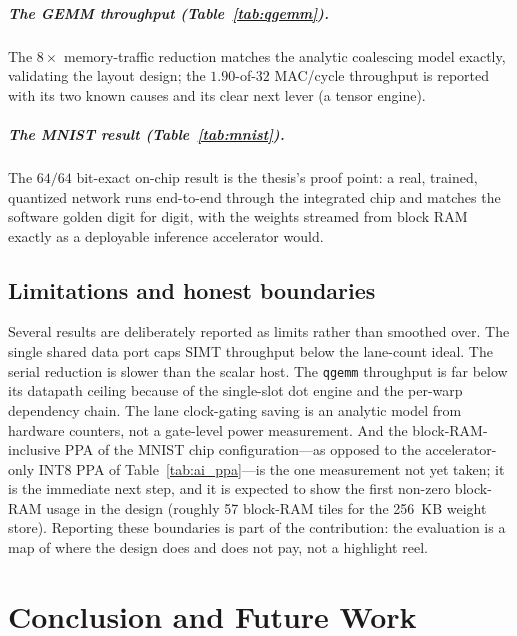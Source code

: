 \documentclass[12pt,a4paper,oneside]{report}
\newcommand{\code}[1]{\texttt{#1}}
\begin{document}
\paragraph{The GEMM throughput (Table~\ref{tab:qgemm}).} The $8\times$
memory-traffic reduction matches the analytic coalescing model exactly, validating
the layout design; the $1.90$-of-$32$ MAC/cycle throughput is reported with its two
known causes and its clear next lever (a tensor engine).

\paragraph{The MNIST result (Table~\ref{tab:mnist}).} The $64/64$ bit-exact
on-chip result is the thesis's proof point: a real, trained, quantized network runs
end-to-end through the integrated chip and matches the software golden digit for
digit, with the weights streamed from block RAM exactly as a deployable inference
accelerator would.

\section{Limitations and honest boundaries}
Several results are deliberately reported as limits rather than smoothed over. The
single shared data port caps SIMT throughput below the lane-count ideal. The serial
reduction is slower than the scalar host. The \code{qgemm} throughput is far below
its datapath ceiling because of the single-slot dot engine and the per-warp
dependency chain. The lane clock-gating saving is an analytic model from hardware
counters, not a gate-level power measurement. And the block-RAM-inclusive PPA of
the MNIST chip configuration---as opposed to the accelerator-only INT8 PPA of
Table~\ref{tab:ai_ppa}---is the one measurement not yet taken; it is the immediate
next step, and it is expected to show the first non-zero block-RAM usage in the
design (roughly 57 block-RAM tiles for the 256~KB weight store). Reporting these
boundaries is part of the contribution: the evaluation is a map of where the design
does and does not pay, not a highlight reel.

\chapter{Conclusion and Future Work}
\label{ch:conclusion}
\end{document}
